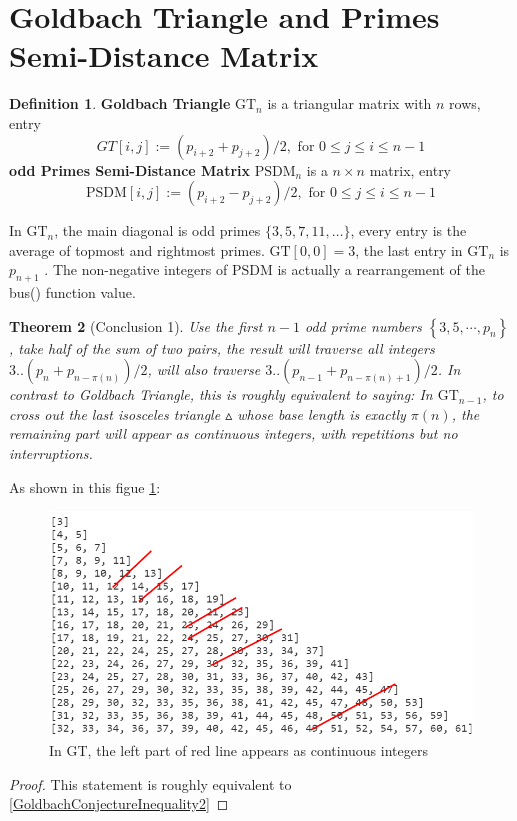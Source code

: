 \documentclass[12pt,a4paper,reqno]{amsart}
\numberwithin{equation}{section}
\theoremstyle{plain}
\newtheorem{theorem}{Theorem}[section]
\theoremstyle{definition}
\newtheorem{definition}[theorem]{Definition}
\begin{document}
	\section{Goldbach Triangle and Primes Semi-Distance Matrix}
	\begin{definition}
		\textbf{Goldbach Triangle} $\text{GT}_n$ is a triangular matrix with $n$ rows, entry 
		\[GT[i,j]:=(p_{i+2}+p_{j+2})/2 , \text{ for } 0 \leq j \leq i \leq n-1\]
		\textbf{odd Primes Semi-Distance Matrix} $\text{PSDM}_n$ is a $n\times n$ matrix, entry 
		\[ \text{PSDM}[i,j]:=(p_{i+2}-p_{j+2})/2 , \text{ for } 0 \leq j \leq i \leq n-1\]
	\end{definition}
	In $\text{GT}_n$, the main diagonal is odd primes $\{3,5,7,11,\ldots\}$, 
	every entry is the average of topmost and rightmost primes. 
	$\text{GT}[0,0]=3$, the last entry in $\text{GT}_n$ is $p_{n+1}$ . 
	The non-negative integers of $\text{PSDM}$ is actually a rearrangement of the 
	bus() function value. 
	\begin{theorem}[Conclusion 1]
		Use the first $n-1$ odd prime numbers $\left\{ 3,5, \cdots ,p_n \right\}$, 
		take half of the sum of two pairs, the result will traverse all integers
		$3..({p_n} + {p_{n - \pi \left( n \right)}})/2$, will also traverse 
		$3..({p_{n-1} + {p_{n - \pi \left( n \right)+1}}})/2$. In contrast to 
		Goldbach Triangle, this is roughly equivalent to saying: In $\text{GT}_{n-1}$, 
		to cross out the last isosceles triangle $\vartriangle$ whose base 
		length is exactly $\pi(n)$, the remaining part will appear as continuous integers, 
		with repetitions but no interruptions. 
	\end{theorem}
	As shown in this figue \ref{fig:conclusion1}:
	\begin{figure}[h]
		\includegraphics[]{20230830conclusion1.png}
		\caption{In GT, the left part of red line appears as continuous integers}
		\label{fig:conclusion1}
	\end{figure}
	\begin{proof}
		This statement is roughly equivalent to \eqref{GoldbachConjectureInequality2}
	\end{proof}
\end{document}
